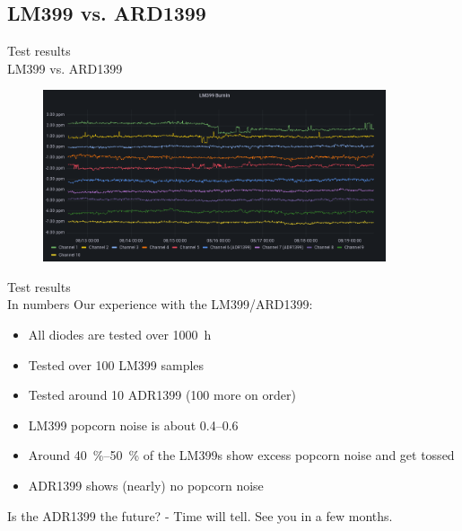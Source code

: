 \documentclass[color={accentcolor=1b}, authorontitle=true]{tudabeamer}
\begin{document}
\subsection{LM399 vs. ARD1399}
\begin{frame}{Test results\\\textnormal{\small{LM399 vs. ARD1399}}}
    \begin{figure}
        \includegraphics[width=0.9\textwidth]{images/lm399_burnin.png}
    \end{figure}
\end{frame}

\begin{frame}{Test results\\\textnormal{\small{In numbers}}}
    Our experience with the LM399/ARD1399:
    \begin{itemize}
        \item All diodes are tested over \qty{1000}{\hour}
        \item Tested over 100 LM399 samples
        \item Tested around 10 ADR1399 (100 more on order)
        \item LM399 popcorn noise is about {\color{red}\qtyrange{0.4}{0.6}{\ppm}}
        \item Around {\color{red}\qtyrange{40}{50}{\percent}} of the LM399s show excess popcorn noise and get tossed
        \item ADR1399 shows (nearly) no popcorn noise
    \end{itemize}

    \Large{Is the ADR1399 the future? - Time will tell. See you in a few months.}
\end{frame}
\end{document}

